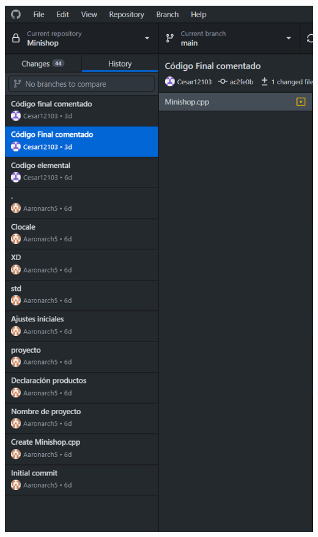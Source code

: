 \documentclass{article}
\begin{document}
    
    \begin{center} 
	\includegraphics[scale=0.3]{Images/Captura de pantalla (213).png}
	\label{figura3a}
\end{center}
\end{document}
